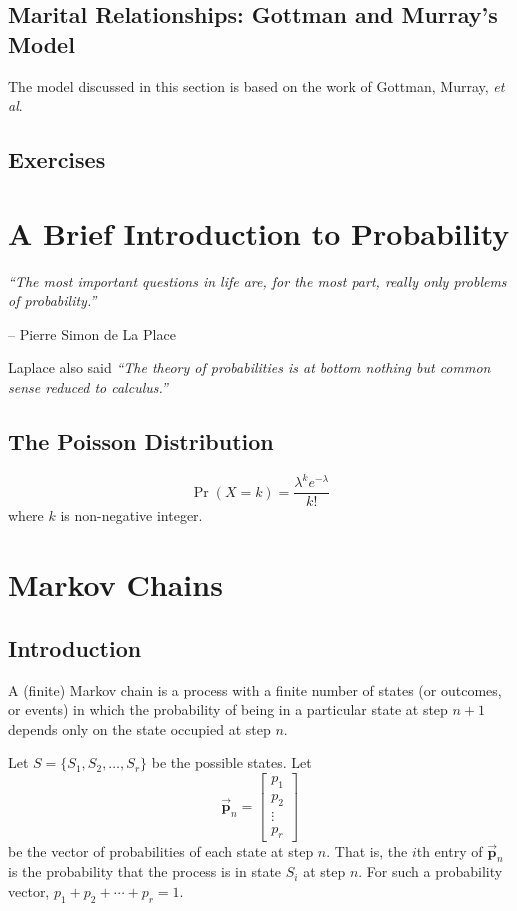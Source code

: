 \documentclass[reqno]{immbook}
\newcommand{\BP}{\vec{\textbf{p}}}
\numberwithin{equation}{chapter}
\numberwithin{question}{section}
\numberwithin{theorem}{chapter}
\numberwithin{figure}{chapter}
\theoremstyle{definition}
\begin{document}
\section{Marital Relationships: Gottman and Murray's Model}
The model discussed in this section is based on the
work of Gottman, Murray, \emph{et al}\cite{GM}.
\section{Exercises}
%
%
%
%
\chapter{A Brief Introduction to Probability}

\emph{``The most important questions in life are, for the 
       most part, really only problems of probability.''}


\hfill            -- Pierre Simon de La Place

\bigskip
Laplace also said \emph{``The theory of probabilities is at bottom nothing but common sense 
      reduced to calculus.''}


\section{The Poisson Distribution}
\begin{equation}
  \Pr(X=k) = \frac{\lambda^k e^{-\lambda}}{k!}
\end{equation}
where $k$ is non-negative integer.



\chapter{Markov Chains}

\section{Introduction}
A (finite) Markov chain is a process with a finite
number of states (or outcomes, or events) in which
the probability of being in a particular state
at step $n+1$ depends only on the state occupied
at step $n$.

Let $S = \{S_1,S_2,\ldots,S_r\}$ be the possible states.
Let
\begin{equation}
   \BP_n = \begin{bmatrix}
               p_1 \\ p_2 \\ \vdots \\ p_r
           \end{bmatrix}
\end{equation}
be the vector  of probabilities of each state
at step $n$. That is, the $i$th entry of $\BP_n$
is the probability that the process is in
state $S_i$ at step $n$.
For such a probability vector, $p_1+p_2+\cdots+p_r = 1$.
\end{document}
